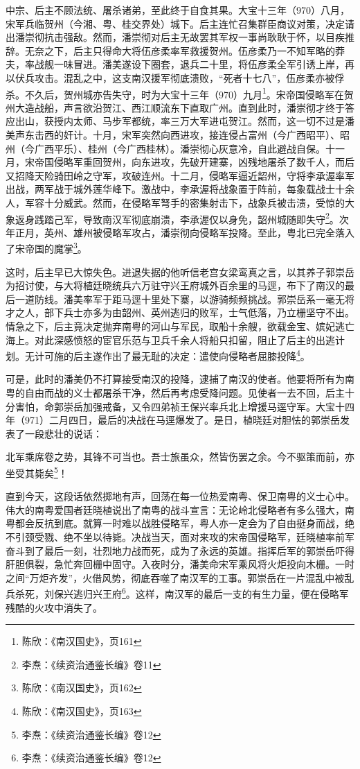 中宗、后主不顾法统、屠杀诸弟，至此终于自食其果。大宝十三年（970）八月，宋军兵临贺州（今湘、粤、桂交界处）城下。后主连忙召集群臣商议对策，决定请出潘崇彻抗击强敌。然而，潘崇彻对后主无故罢其军权一事尚耿耿于怀，以目疾推辞。无奈之下，后主只得命大将伍彦柔率军救援贺州。伍彦柔乃一不知军略的莽夫，率战舰一味冒进。潘美遂设下圈套，退兵二十里，将伍彦柔全军引诱上岸，再以伏兵攻击。混乱之中，这支南汉援军彻底溃败，“死者十七八”，伍彦柔亦被俘杀。不久后，贺州城亦告失守，时为大宝十三年（970）九月\footnote{陈欣：《南汉国史》，页161}。宋帝国侵略军在贺州大造战船，声言欲沿贺江、西江顺流东下直取广州。直到此时，潘崇彻才终于答应出山，获授内太师、马步军都统，率三万大军进屯贺江。然而，这一切不过是潘美声东击西的奸计。十月，宋军突然向西进攻，接连侵占富州（今广西昭平）、昭州（今广西平乐）、桂州（今广西桂林）。潘崇彻心灰意冷，自此避战自保。十一月，宋帝国侵略军重回贺州，向东进攻，先破开建寨，凶残地屠杀了数千人，而后又招降天险骑田岭之守军，攻破连州。十二月，侵略军逼近韶州，守将李承渥率军出战，两军战于城外莲华峰下。激战中，李承渥将战象置于阵前，每象载战士十余人，军容十分威武。然而，在侵略军弩手的密集射击下，战象兵被击溃，受惊的大象返身践踏己军，导致南汉军彻底崩溃，李承渥仅以身免，韶州城随即失守\footnote{李焘：《续资治通鉴长编》卷11}。次年正月，英州、雄州被侵略军攻占，潘崇彻向侵略军投降。至此，粤北已完全落入了宋帝国的魔掌\footnote{陈欣：《南汉国史》，页162}。

这时，后主早已大惊失色。进退失据的他听信老宫女梁鸾真之言，以其养子郭崇岳为招讨使，与大将植廷晓统兵六万驻守兴王府城外百余里的马逕，布下了南汉的最后一道防线。潘美率军于距马逕十里处下寨，以游骑频频挑战。郭崇岳系一毫无将才之人，部下兵士亦多为由韶州、英州逃归的败军，士气低落，乃立栅坚守不出。情急之下，后主竟决定抛弃南粤的河山与军民，取船十余艘，欲载金宝、嫔妃逃亡海上。对此深感愤怒的宦官乐范与卫兵千余人将船只扣留，阻止了后主的出逃计划。无计可施的后主遂作出了最无耻的决定：遣使向侵略者屈膝投降\footnote{陈欣：《南汉国史》，页163}。

可是，此时的潘美仍不打算接受南汉的投降，逮捕了南汉的使者。他要将所有为南粤的自由而战的义士都屠杀干净，然后再考虑受降问题。见使者一去不回，后主十分害怕，命郭崇岳加强戒备，又令四弟祯王保兴率兵北上增援马逕守军。大宝十四年（971）二月四日，最后的决战在马逕爆发了。是日，植晓廷对胆怯的郭崇岳发表了一段悲壮的说话：

北军乘席卷之势，其锋不可当也。吾士旅虽众，然皆伤罢之余。今不驱策而前，亦坐受其毙矣\footnote{李焘：《续资治通鉴长编》卷12}！

直到今天，这段话依然掷地有声，回荡在每一位热爱南粤、保卫南粤的义士心中。伟大的南粤爱国者廷晓植说出了南粤的战斗宣言：无论岭北侵略者有多么强大，南粤都会反抗到底。就算一时难以战胜侵略军，粤人亦一定会为了自由挺身而战，绝不引颈受戮、绝不坐以待毙。决战当天，面对来攻的宋帝国侵略军，廷晓植率前军奋斗到了最后一刻，壮烈地力战而死，成为了永远的英雄。指挥后军的郭崇岳吓得肝胆俱裂，急忙奔回栅中固守。入夜时分，潘美命宋军乘风将火炬投向木栅。一时之间“万炬齐发”，火借风势，彻底吞噬了南汉军的工事。郭崇岳在一片混乱中被乱兵杀死，刘保兴逃归兴王府\footnote{李焘：《续资治通鉴长编》卷12}。这样，南汉军的最后一支的有生力量，便在侵略军残酷的火攻中消失了。

